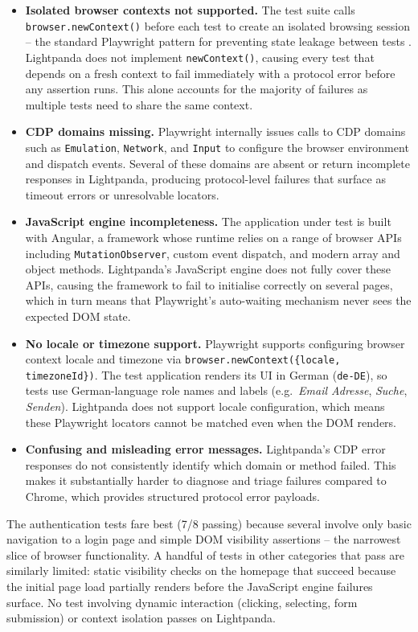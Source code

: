 \begin{itemize}
    \item \textbf{Isolated browser contexts not supported.} The test suite calls \texttt{browser.newContext()} before each test to create an isolated browsing session -- the standard Playwright pattern for preventing state leakage between tests \cite{playwright2024}. Lightpanda does not implement \texttt{newContext()}, causing every test that depends on a fresh context to fail immediately with a protocol error before any assertion runs. This alone accounts for the majority of failures as multiple tests need to share the same context.

    \item \textbf{CDP domains missing.} Playwright internally issues calls to CDP domains such as \texttt{Emulation}, \texttt{Network}, and \texttt{Input} to configure the browser environment and dispatch events. Several of these domains are absent or return incomplete responses in Lightpanda, producing protocol-level failures that surface as timeout errors or unresolvable locators.

    \item \textbf{JavaScript engine incompleteness.} The application under test is built with Angular, a framework whose runtime relies on a range of browser APIs including \texttt{MutationObserver}, custom event dispatch, and modern array and object methods. Lightpanda's JavaScript engine does not fully cover these APIs, causing the framework to fail to initialise correctly on several pages, which in turn means that Playwright's auto-waiting mechanism never sees the expected DOM state.

    \item \textbf{No locale or timezone support.} Playwright supports configuring browser context locale and timezone via \texttt{browser.newContext(\{locale, timezoneId\})}. The test application renders its UI in German (\texttt{de-DE}), so tests use German-language role names and labels (e.g.\ \textit{Email Adresse}, \textit{Suche}, \textit{Senden}). Lightpanda does not support locale configuration, which means these Playwright locators cannot be matched even when the DOM renders.

    \item \textbf{Confusing and misleading error messages.} Lightpanda's CDP error responses do not consistently identify which domain or method failed. This makes it substantially harder to diagnose and triage failures compared to Chrome, which provides structured protocol error payloads.
\end{itemize}

The authentication tests fare best (7/8 passing) because several involve only basic navigation to a login page and simple DOM visibility assertions -- the narrowest slice of browser functionality. A handful of tests in other categories that pass are similarly limited: static visibility checks on the homepage that succeed because the initial page load partially renders before the JavaScript engine failures surface. No test involving dynamic interaction (clicking, selecting, form submission) or context isolation passes on Lightpanda.
